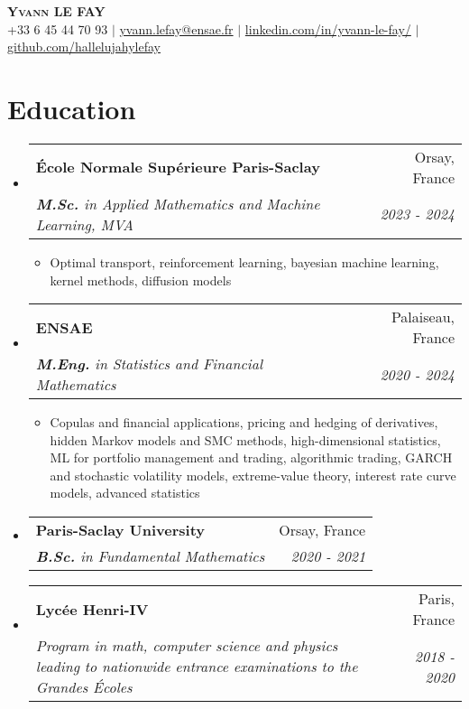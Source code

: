 \documentclass[letterpaper,10pt]{article}
\makeatletter
\newcommand{\resumeItem}[1]{
    \item\small{
            {#1 \vspace{-2pt}}
    }
}
\newcommand{\resumeSubheading}[4]{
    \vspace{-2pt}\item
    \begin{tabular*}{0.97\textwidth}[t]{l@{\extracolsep{\fill}}r}
        \textbf{#1}       & #2                 \\
        \textit{\small#3} & \textit{\small #4} \\
    \end{tabular*}\vspace{-7pt}
}
\newcommand{\resumeSubHeadingListStart}{\begin{itemize}[leftmargin=0.15in, label={}]}
\newcommand{\resumeSubHeadingListEnd}{\end{itemize}}
\newcommand{\resumeItemListStart}{\begin{itemize}}
\newcommand{\resumeItemListEnd}{\end{itemize}\vspace{-5pt}}
\makeatother
\begin{document}

\begin{center}
\textbf{\scshape Yvann LE FAY} \\ \vspace{1pt}
\small +33 6 45 44 70 93 $|$ \href{mailto:yvann.lefay@ensae.fr}{yvann.lefay@ensae.fr} $|$
\href{https://linkedin.com/in/yvann-le-fay/}{linkedin.com/in/yvann-le-fay/} $|$
\href{https://github.com/hallelujahylefay}{github.com/hallelujahylefay}
\end{center}


\section{Education}
\resumeSubHeadingListStart
\resumeSubheading
{\'Ecole Normale Supérieure Paris-Saclay}{Orsay, France}{\textbf{M.Sc.} in Applied Mathematics and Machine Learning, MVA}{2023 - 2024}
\resumeItemListStart
\resumeItem{Optimal transport, reinforcement learning, bayesian machine learning, kernel methods, diffusion models}
\resumeItemListEnd
\resumeSubheading
{ENSAE}{Palaiseau, France}{\textbf{M.Eng.} in Statistics and Financial Mathematics}{2020 - 2024}
\resumeItemListStart
\resumeItem{Copulas and financial applications, pricing and hedging of derivatives, hidden Markov models and SMC methods, high-dimensional statistics, ML for portfolio management and trading, algorithmic trading, GARCH and stochastic volatility models, extreme-value theory, interest rate curve models, advanced statistics}
\resumeItemListEnd
\resumeSubheading
{Paris-Saclay University}{Orsay, France}{\textbf{B.Sc.} in Fundamental Mathematics }
{2020 - 2021}
\resumeSubheading{Lycée Henri-IV}{Paris, France}
{Program in math, computer science and physics leading to nationwide entrance examinations to the \textit{Grandes Écoles}}{2018 - 2020}
\resumeSubHeadingListEnd
\end{document}
